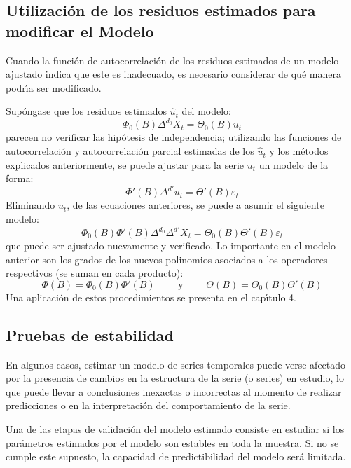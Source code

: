 \subsection{Utilizaci\'{o}n de los residuos estimados para modificar el Modelo}

Cuando la funci\'{o}n de autocorrelaci\'{o}n de los residuos estimados de un 
modelo ajustado indica que este es inadecuado, es necesario considerar de 
qu\'{e} manera podr\'{\i}a ser modificado. 

Sup\'{o}ngase que los residuos estimados $\widehat{u}_{t}$ del modelo:
\[
{\Phi }_{0}\left( B \right){\Delta }^{d_{0}}X_{t}={\Theta }_{0}(B)u_{t}
\]
parecen no verificar las hip\'{o}tesis de independencia; utilizando las 
funciones de autocorrelaci\'{o}n y autocorrelaci\'{o}n parcial estimadas de 
los $\widehat{u}_{t}$ y los m\'{e}todos explicados anteriormente, se puede 
ajustar para la serie $u_{t}$ un modelo de la forma:
\[
{\Phi }'\left( B \right){\Delta }^{d'}u_{t}={\Theta }'(B)\varepsilon_{t}
\]
Eliminando $u_{t}$, de las ecuaciones anteriores, se puede a asumir el 
siguiente modelo:
\[
{\Phi }_{0}\left( B \right){\Phi }'\left( B \right){\Delta }^{d_{0}}{\Delta}^{d'}X_{t}={\Theta }_{0}(B){\Theta }'(B)\varepsilon_{t}
\]
que puede ser ajustado nuevamente y verificado. Lo importante en el modelo 
anterior son los grados de los nuevos polinomios asociados a los operadores 
respectivos (se suman en cada producto):
\[
{\Phi }\left( {B} \right){=}{\Phi }_{0}\left( B \right){\Phi }'\left( B \right)    
\qquad \text{ y }\qquad          
{\Theta }\left( {B} \right){=}{\Theta }_{0}(B){\Theta }'(B)        
\]
Una aplicaci\'{o}n de estos procedimientos se presenta en el cap\'{\i}tulo 
4.

\subsection{Pruebas de estabilidad}

En algunos casos, estimar un modelo de series temporales puede verse 
afectado por la presencia de cambios en la estructura de la serie (o series) 
en estudio, lo que puede llevar a conclusiones inexactas o incorrectas al 
momento de realizar predicciones o en la interpretaci\'{o}n del 
comportamiento de la serie.

Una de las etapas de validaci\'{o}n del modelo estimado consiste en estudiar 
si los par\'{a}metros estimados por el modelo son estables en toda la 
muestra. Si no se cumple este supuesto, la capacidad de predictibilidad del 
modelo ser\'{a} limitada.


